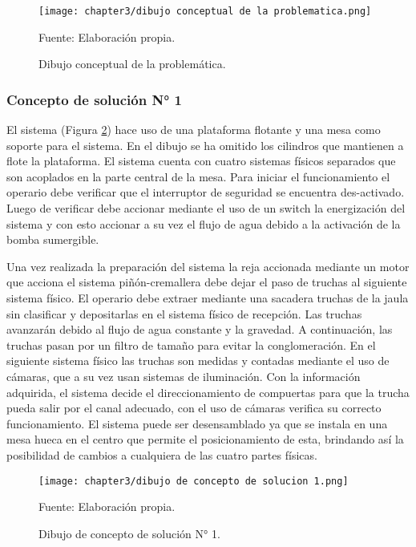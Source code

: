 \begin{figure}[H]
	\centering
	\texttt{[image: chapter3/dibujo conceptual de la problematica.png]}
	\caption{Dibujo conceptual de la problemática.}
	\begin{myflushleftportland}
		Fuente: Elaboración propia.
	\end{myflushleftportland}
	\label{fig:dibujo conceptual de la problematica}
\end{figure}

\subsubsection{Concepto de solución N° 1}

El sistema (Figura \ref{fig:dibujo de concepto de solucion 1}) hace uso de una plataforma flotante y una mesa como soporte para el sistema. En el dibujo se ha omitido los cilindros que mantienen a flote la plataforma. El sistema cuenta con cuatro sistemas físicos separados que son acoplados en la parte central de la mesa. Para iniciar el funcionamiento el operario debe verificar que el interruptor de seguridad se encuentra des-activado. Luego de verificar debe accionar mediante el uso de un switch la energización del sistema y con esto accionar a su vez el flujo de agua debido a la activación de la bomba sumergible.

Una vez realizada la preparación del sistema la reja accionada mediante un motor que acciona el sistema piñón-cremallera debe dejar el paso de truchas al siguiente sistema físico. El operario debe extraer mediante una sacadera truchas de la jaula sin clasificar y depositarlas en el sistema físico de recepción. Las truchas avanzarán debido al flujo de agua constante y la gravedad. A continuación, las truchas pasan por un filtro de tamaño para evitar la conglomeración. En el siguiente sistema físico las truchas son medidas y contadas mediante el uso de cámaras, que a su vez usan sistemas de iluminación. Con la información adquirida, el sistema decide el direccionamiento de compuertas para que la trucha pueda salir por el canal adecuado, con el uso de cámaras verifica su correcto funcionamiento.
El sistema puede ser desensamblado ya que se instala en una mesa hueca en el centro que permite el posicionamiento de esta, brindando así la posibilidad de cambios a cualquiera de las cuatro partes físicas.


\begin{figure}[H]
	\centering
	\texttt{[image: chapter3/dibujo de concepto de solucion 1.png]}
	\caption{Dibujo de concepto de solución N° 1.}
	\begin{myflushleftportland}
		Fuente: Elaboración propia.
	\end{myflushleftportland}
	\label{fig:dibujo de concepto de solucion 1}
\end{figure}



